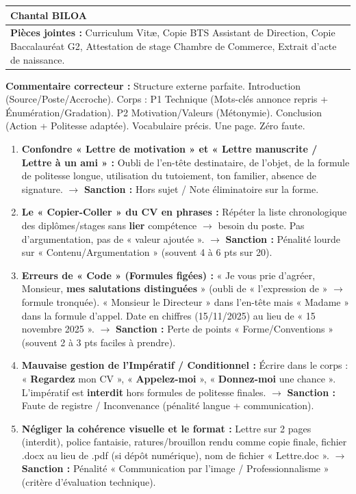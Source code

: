 \documentclass[11pt]{article}
\begin{document}
\begin{exoresolu}
\begin{center}
\begin{tabularx}{\linewidth}{|X|}
    \hfill \textbf{Chantal BILOA} \\ \hline
    \textbf{Pièces jointes :} Curriculum Vitæ, Copie BTS Assistant de Direction, Copie Baccalauréat G2, Attestation de stage Chambre de Commerce, Extrait d'acte de naissance. \\ \hline
    \end{tabularx}
    \end{center}
    \textbf{Commentaire correcteur :} Structure externe parfaite. Introduction (Source/Poste/Accroche). Corps : P1 Technique (Mots-clés annonce repris + Énumération/Gradation). P2 Motivation/Valeurs (Métonymie). Conclusion (Action + Politesse adaptée). Vocabulaire précis. Une page. Zéro faute.
\end{exoresolu}

\begin{attention}
    \begin{enumerate}
        \item \textbf{Confondre « Lettre de motivation » et « Lettre manuscrite / Lettre à un ami » :} Oubli de l'en-tête destinataire, de l'objet, de la formule de politesse longue, utilisation du tutoiement, ton familier, absence de signature. $\rightarrow$ \textbf{Sanction :} Hors sujet / Note éliminatoire sur la forme.
        \item \textbf{Le « Copier-Coller » du CV en phrases :} Répéter la liste chronologique des diplômes/stages sans \textbf{lier} compétence $\rightarrow$ besoin du poste. Pas d'argumentation, pas de « valeur ajoutée ». $\rightarrow$ \textbf{Sanction :} Pénalité lourde sur « Contenu/Argumentation » (souvent 4 à 6 pts sur 20).
        \item \textbf{Erreurs de « Code » (Formules figées) :} « Je vous prie d'agréer, Monsieur, \textbf{mes salutations distinguées} » (oubli de « l'expression de » $\rightarrow$ formule tronquée). « Monsieur le Directeur » dans l'en-tête mais « Madame » dans la formule d'appel. Date en chiffres (15/11/2025) au lieu de « 15 novembre 2025 ». $\rightarrow$ \textbf{Sanction :} Perte de points « Forme/Conventions » (souvent 2 à 3 pts faciles à prendre).
        \item \textbf{Mauvaise gestion de l'Impératif / Conditionnel :} Écrire dans le corps : « \textbf{Regardez} mon CV », « \textbf{Appelez-moi} », « \textbf{Donnez-moi} une chance ». L'impératif est \textbf{interdit} hors formules de politesse finales. $\rightarrow$ \textbf{Sanction :} Faute de registre / Inconvenance (pénalité langue + communication).
        \item \textbf{Négliger la cohérence visuelle et le format :} Lettre sur 2 pages (interdit), police fantaisie, ratures/brouillon rendu comme copie finale, fichier .docx au lieu de .pdf (si dépôt numérique), nom de fichier « Lettre.doc ». $\rightarrow$ \textbf{Sanction :} Pénalité « Communication par l'image / Professionnalisme » (critère d'évaluation technique).
    \end{enumerate}
\end{attention}
\end{document}
